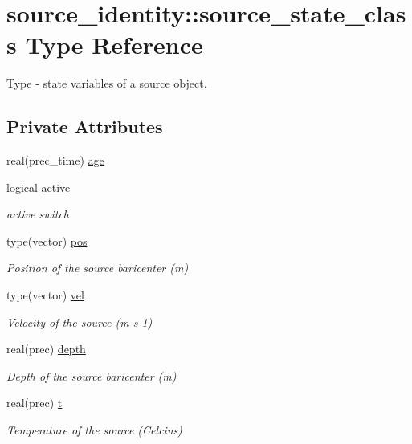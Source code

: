 \hypertarget{structsource__identity_1_1source__state__class}{}\section{source\+\_\+identity\+:\+:source\+\_\+state\+\_\+class Type Reference}
\label{structsource__identity_1_1source__state__class}


Type -\/ state variables of a source object.  


\subsection*{Private Attributes}
\begin{DoxyCompactItemize}
\item 
real(prec\+\_\+time) \mbox{\hyperlink{structsource__identity_1_1source__state__class_a820dc7c568f3cb21ccb68f5fa74b2766}{age}}
\item 
logical \mbox{\hyperlink{structsource__identity_1_1source__state__class_a4f53c84cc4ecb9c9700eb5df698200d8}{active}}
\begin{DoxyCompactList}\small\item\em active switch \end{DoxyCompactList}\item 
type(vector) \mbox{\hyperlink{structsource__identity_1_1source__state__class_ae69e4ee310f6c496d8c537bc2ab5cda6}{pos}}
\begin{DoxyCompactList}\small\item\em Position of the source baricenter (m) \end{DoxyCompactList}\item 
type(vector) \mbox{\hyperlink{structsource__identity_1_1source__state__class_ad3949289a86679cb23febfe41c051e59}{vel}}
\begin{DoxyCompactList}\small\item\em Velocity of the source (m s-\/1) \end{DoxyCompactList}\item 
real(prec) \mbox{\hyperlink{structsource__identity_1_1source__state__class_a67b39860ac7d45545c522a2f3cd851e8}{depth}}
\begin{DoxyCompactList}\small\item\em Depth of the source baricenter (m) \end{DoxyCompactList}\item 
real(prec) \mbox{\hyperlink{structsource__identity_1_1source__state__class_aa6b7ef1194f4f7379e86242b4dffc03f}{t}}
\begin{DoxyCompactList}\small\item\em Temperature of the source (Celcius) \end{DoxyCompactList}\end{DoxyCompactItemize}


